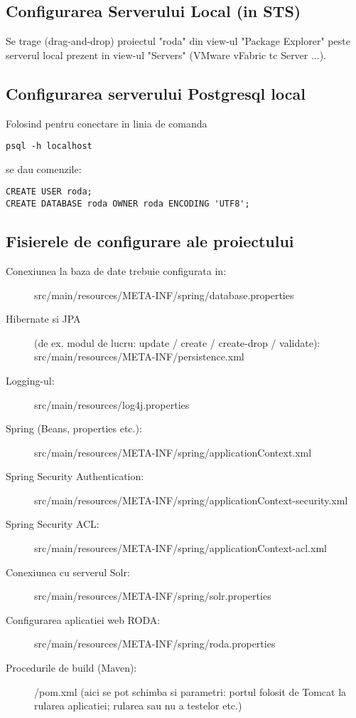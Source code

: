 \subsection{Configurarea Serverului Local (in STS)}
Se trage (drag-and-drop) proiectul "roda" din view-ul "Package Explorer" 
peste serverul local prezent in view-ul "Servers" (VMware vFabric tc Server ...).

\subsection{Configurarea serverului Postgresql local}
Folosind pentru conectare in linia de comanda
\begin{lstlisting}
psql -h localhost
\end{lstlisting}
se dau comenzile:
\begin{lstlisting}
CREATE USER roda;
CREATE DATABASE roda OWNER roda ENCODING 'UTF8';
\end{lstlisting}

\subsection{Fisierele de configurare ale proiectului}
\begin{description}
\item[Conexiunea la baza de date trebuie configurata in:]
src/main/resources/META-INF/spring/database.properties
\item[Hibernate si JPA] (de ex. modul de lucru: update / create / create-drop /
validate):
src/main/resources/META-INF/persistence.xml
\item[Logging-ul:]
src/main/resources/log4j.properties
\item[Spring (Beans, properties etc.):]
src/main/resources/META-INF/spring/applicationContext.xml
\item[Spring Security Authentication:]
src/main/resources/META-INF/spring/applicationContext-security.xml
\item[Spring Security ACL:]
src/main/resources/META-INF/spring/applicationContext-acl.xml
\item[Conexiunea cu serverul Solr:]
src/main/resources/META-INF/spring/solr.properties
\item[Configurarea aplicatiei web RODA:]
src/main/resources/META-INF/spring/roda.properties
\item[Procedurile de build (Maven):]
/pom.xml
(aici se pot schimba si parametri: portul folosit de Tomcat la rularea aplicatiei; rularea sau nu a testelor etc.)
\end{description}

